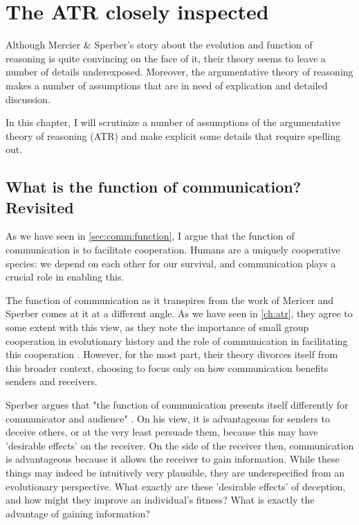 \chapter{The ATR closely inspected}
\label{ch:scrutiny}

Although Mercier \& Sperber's story about the evolution and function of reasoning is quite convincing on the face of it, their theory seems to leave a number of details underexposed. Moreover, the argumentative theory of reasoning makes a number of assumptions that are in need of explication and detailed discussion.

In this chapter, I will scrutinize a number of assumptions of the argumentative theory of reasoning (ATR) and make explicit some details that require spelling out.

\section{What is the function of communication? Revisited}
\label{sec:comm-func-scrutiny}

As we have seen in \cref{sec:comm:function}, I argue that the function of communication is to facilitate cooperation. Humans are a uniquely cooperative species: we depend on each other for our survival, and communication plays a crucial role in enabling this.

The function of communication as it transpires from the work of Mericer and Sperber comes at it at a different angle.
As we have seen in \cref{ch:atr}, they agree to some extent with this view, as they note the importance of small group cooperation in evolutionary history and the role of communication in facilitating this cooperation \citep[p.~60]{MS11}.
However, for the most part, their theory divorces itself from this broader context, choosing to focus only on how communication benefits senders and receivers.

Sperber argues that "the function of communication presents itself differently for communicator and audience" \citep[p.~411]{Sperber01}. On his view, it is advantageous for senders to deceive others, or at the very least persuade them, because this may have 'desirable effects' on the receiver. On the side of the receiver then, communication is advantageous because it allows the receiver to gain information.
While these things may indeed be intuitively very plausible, they are underspecified from an evolutionary perspective. What exactly are these 'desirable effects' of deception, and how might they improve an individual's fitness? What is exactly the advantage of gaining information?

